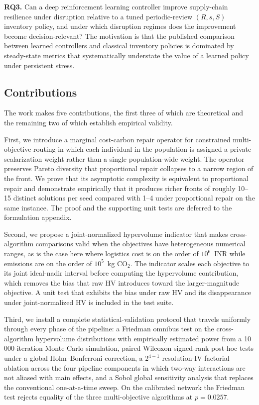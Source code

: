 \documentclass[review,preprint,authoryear,12pt]{elsarticle}
\newcommand{\COtwo}{\ensuremath{\mathrm{CO}_{2}}}
\begin{document}
\textbf{RQ3.} Can a deep reinforcement learning controller improve
supply-chain resilience under disruption relative to a tuned
periodic-review $(R, s, S)$ inventory policy, and under which
disruption regimes does the improvement become decision-relevant? The
motivation is that the published comparison between learned controllers
and classical inventory policies is dominated by steady-state metrics
that systematically understate the value of a learned policy under
persistent stress.

\subsection{Contributions}
\label{sec:contributions}

The work makes five contributions, the first three of which are
theoretical and the remaining two of which establish empirical
validity.

First, we introduce a marginal cost-carbon repair operator for
constrained multi-objective routing in which each individual in the
population is assigned a private scalarization weight rather than a
single population-wide weight. The operator preserves Pareto diversity
that proportional repair collapses to a narrow region of the front.
We prove that its asymptotic complexity is equivalent to proportional
repair and demonstrate empirically that it produces richer fronts of
roughly 10--15 distinct solutions per seed compared with 1--4 under
proportional repair on the same instance. The proof and the supporting
unit tests are deferred to the formulation appendix.

Second, we propose a joint-normalized hypervolume indicator that makes
cross-algorithm comparisons valid when the objectives have
heterogeneous numerical ranges, as is the case here where logistics
cost is on the order of $10^6$~INR while emissions are on the order
of $10^5$~kg \COtwo{}. The indicator scales each objective to its
joint ideal-nadir interval before computing the hypervolume contribution,
which removes the bias that raw HV introduces toward the
larger-magnitude objective. A unit test that exhibits the bias under
raw HV and its disappearance under joint-normalized HV is included in
the test suite.

Third, we install a complete statistical-validation protocol that
travels uniformly through every phase of the pipeline: a Friedman
omnibus test on the cross-algorithm hypervolume distributions with
empirically estimated power from a 10\,000-iteration Monte Carlo
simulation, paired Wilcoxon signed-rank post-hoc tests under a global
Holm--Bonferroni correction, a $2^{4-1}$ resolution-IV factorial
ablation across the four pipeline components in which two-way
interactions are not aliased with main effects, and a Sobol global
sensitivity analysis that replaces the conventional one-at-a-time
sweep. On the calibrated network the Friedman test rejects equality
of the three multi-objective algorithms at $p = 0.0257$.
\end{document}
